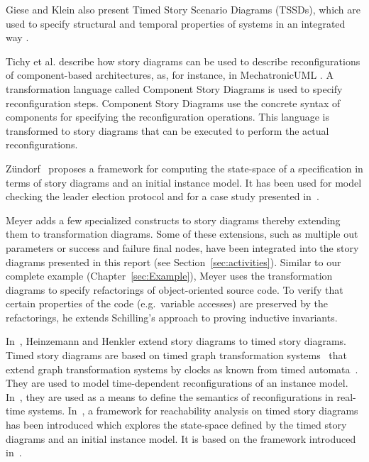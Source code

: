 Giese and Klein also present Timed Story Scenario Diagrams (TSSDs), which are used to specify structural and temporal properties of systems in an integrated way \cite{KG07a}.

Tichy et al. \cite{THH+08} describe how story diagrams can be used to describe reconfigurations of component-based architectures, as, for instance, in MechatronicUML \cite{BBD+12}.
A transformation language called Component Story Diagrams is used to specify reconfiguration steps.
Component Story Diagrams use the concrete syntax of components for specifying the reconfiguration operations.
This language is transformed to story diagrams that can be executed to perform the actual reconfigurations.

Z{\"u}ndorf~\cite{Zue09} proposes a framework for computing the state-space of a specification in terms of story diagrams and an initial instance model. 
It has been used for model checking the leader election protocol and for a case study presented in~\cite{HSJZ10}.

Meyer \cite{Mey09} adds a few specialized constructs to story diagrams thereby extending them to transformation diagrams. Some of these extensions, such as multiple out parameters or success and failure final nodes, have been integrated into the story diagrams presented in this report (see Section~\ref{sec:activities}). Similar to our complete example (Chapter~\ref{sec:Example}), Meyer uses the transformation diagrams to specify refactorings of object-oriented source code. To verify that certain properties of the code (e.g.\ variable accesses) are preserved by the refactorings, he extends Schilling's approach \cite{Sch06} to proving inductive invariants.

In~\cite{HH11b}, Heinzemann and Henkler extend story diagrams to timed story diagrams. 
Timed story diagrams are based on timed graph transformation systems~\cite{EHH+11} that extend graph transformation systems by clocks as known from timed automata~\cite{AD94}. 
They are used to model time-dependent reconfigurations of an instance model. 
In~\cite{EHH+11}, they are used as a means to define the semantics of reconfigurations in real-time systems. 
In~\cite{HSE10}, a framework for reachability analysis on timed story diagrams has been introduced which explores the state-space defined by the timed story diagrams and an initial instance model. 
It is based on the framework introduced in~\cite{Zue09}.


